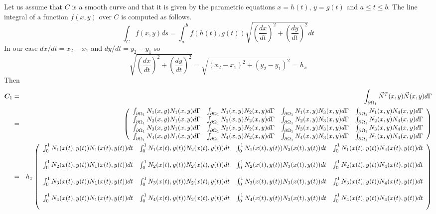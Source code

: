 Let us assume that $C$ is a smooth curve and that it is given by the 
parametric equations $x=h(t)$, $y=g(t)$ and $a\leq t \leq b$. The line integral 
of a function $f(x,y)$ over $C$ is computed as follows. 
\[
\int_C f(x,y) ds = \int_a^b f(h(t),g(t)) \sqrt{\left(\frac{dx}{dt}\right)^2 + \left(\frac{dy}{dt}\right)^2} dt
\]
In our case $dx/dt=x_2-x_1$ and $dy/dt=y_2-y_1$ so 
\[
\sqrt{\left(\frac{dx}{dt}\right)^2 + \left(\frac{dy}{dt}\right)^2}
=\sqrt{(x_2-x_1)^2+(y_2-y_1)^2} = h_x
\]
Then 
\begin{eqnarray}
{\bm C}_1
&=&\int_{\partial\Omega_1} \vec{N}^T(x,y) \vec{N}(x,y) d\Gamma \nonumber\\
&=&
\left(
\begin{array}{cccc}
\int_{\partial\Omega_1} N_1(x,y)N_1(x,y) d\Gamma & 
\int_{\partial\Omega_1} N_1(x,y)N_2(x,y) d\Gamma &
\int_{\partial\Omega_1} N_1(x,y)N_3(x,y) d\Gamma & 
\int_{\partial\Omega_1} N_1(x,y)N_4(x,y) d\Gamma \\
\int_{\partial\Omega_1} N_2(x,y)N_1(x,y) d\Gamma & 
\int_{\partial\Omega_1} N_2(x,y)N_2(x,y) d\Gamma &
\int_{\partial\Omega_1} N_2(x,y)N_3(x,y) d\Gamma &
\int_{\partial\Omega_1} N_2(x,y)N_4(x,y) d\Gamma \\
\int_{\partial\Omega_1} N_3(x,y)N_1(x,y) d\Gamma & 
\int_{\partial\Omega_1} N_3(x,y)N_2(x,y) d\Gamma &
\int_{\partial\Omega_1} N_3(x,y)N_3(x,y) d\Gamma & 
\int_{\partial\Omega_1} N_3(x,y)N_4(x,y) d\Gamma \\ 
\int_{\partial\Omega_1} N_4(x,y)N_1(x,y) d\Gamma & 
\int_{\partial\Omega_1} N_4(x,y)N_2(x,y) d\Gamma &
\int_{\partial\Omega_1} N_4(x,y)N_3(x,y) d\Gamma & 
\int_{\partial\Omega_1} N_4(x,y)N_4(x,y) d\Gamma 
\end{array}
\right) \nonumber\\
&=&
h_x
\left(
\begin{array}{cccc}
\int_{0}^1 N_1(x(t),y(t))N_1(x(t),y(t)) dt & 
\int_{0}^1 N_1(x(t),y(t))N_2(x(t),y(t)) dt &
\int_{0}^1 N_1(x(t),y(t))N_3(x(t),y(t)) dt &
\int_{0}^1 N_1(x(t),y(t))N_4(x(t),y(t)) dt \\\\
\int_{0}^1 N_2(x(t),y(t))N_1(x(t),y(t)) dt & 
\int_{0}^1 N_2(x(t),y(t))N_2(x(t),y(t)) dt &
\int_{0}^1 N_2(x(t),y(t))N_3(x(t),y(t)) dt & 
\int_{0}^1 N_2(x(t),y(t))N_4(x(t),y(t)) dt \\\\
\int_{0}^1 N_3(x(t),y(t))N_1(x(t),y(t)) dt & 
\int_{0}^1 N_3(x(t),y(t))N_2(x(t),y(t)) dt &
\int_{0}^1 N_3(x(t),y(t))N_3(x(t),y(t)) dt &
\int_{0}^1 N_3(x(t),y(t))N_4(x(t),y(t)) dt \\\\
\int_{0}^1 N_4(x(t),y(t))N_1(x(t),y(t)) dt & 
\int_{0}^1 N_4(x(t),y(t))N_2(x(t),y(t)) dt &
\int_{0}^1 N_4(x(t),y(t))N_3(x(t),y(t)) dt &
\int_{0}^1 N_4(x(t),y(t))N_4(x(t),y(t)) dt \\\\
\end{array}
\right) \nonumber\\
\end{eqnarray}
